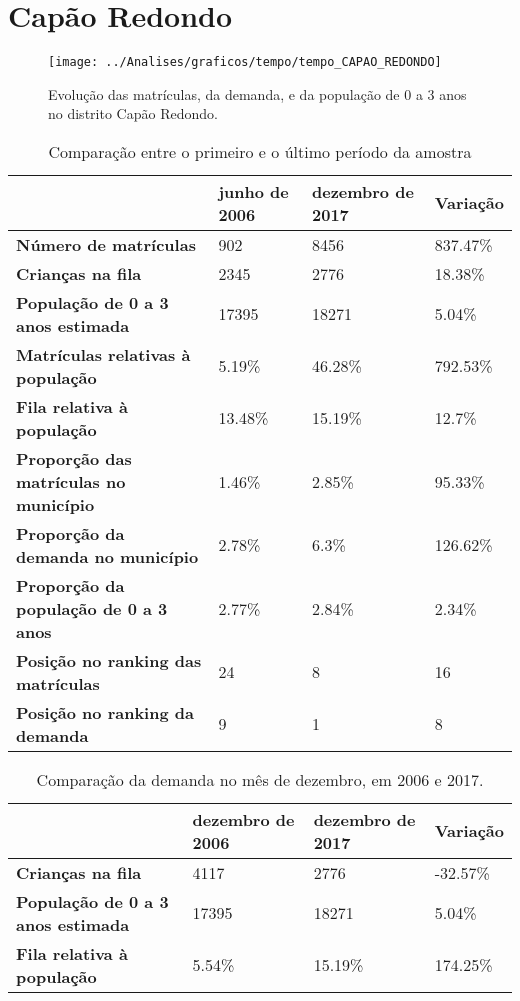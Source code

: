 \section{Capão Redondo}
\begin{figure}[H]
\centering
\texttt{[image: ../Analises/graficos/tempo/tempo\_CAPAO\_REDONDO]}
\caption{Evolução das matrículas, da demanda, e da população de 0 a 3 anos no distrito Capão Redondo.}
\end{figure}
\begin{table}[H]
\begin{tabular}{|l|l|l|l|}
\hline
\textbf{}                                      & \textbf{junho de 2006}       & \textbf{dezembro de 2017}    & \textbf{Variação} \\ \hline
\textbf{Número de matrículas}                  & 902 & 8456 & 837.47\% \\ \hline
\textbf{Crianças na fila}                      & 2345 & 2776 & 18.38\% \\ \hline
\textbf{População de 0 a 3 anos estimada}      & 17395 & 18271 & 5.04\% \\ \hline
\textbf{Matrículas relativas à população}      & 5.19\% & 46.28\% & 792.53\% \\ \hline
\textbf{Fila relativa à população}             & 13.48\% & 15.19\% & 12.7\% \\ \hline
\textbf{Proporção das matrículas no município} & 1.46\% & 2.85\% & 95.33\% \\ \hline
\textbf{Proporção da demanda no município}     & 2.78\% & 6.3\% & 126.62\% \\ \hline
\textbf{Proporção da população de 0 a 3 anos}  & 2.77\% & 2.84\% & 2.34\% \\ \hline
\textbf{Posição no ranking das matrículas}     & 24 & 8 & 16 \\ \hline
\textbf{Posição no ranking da demanda}         & 9 & 1 & 8 \\ \hline
\end{tabular}
\caption{Comparação entre o primeiro e o último período da amostra}
\end{table}
\begin{table}[H]
\begin{tabular}{|l|l|l|l|}
\hline
\textbf{}                                 & \textbf{dezembro de 2006} & \textbf{dezembro de 2017} & \textbf{Variação} \\ \hline
\textbf{Crianças na fila}                      & 4117 & 2776 & -32.57\% \\ \hline
\textbf{População de 0 a 3 anos estimada}      & 17395 & 18271 & 5.04\% \\ \hline
\textbf{Fila relativa à população}             & 5.54\% & 15.19\% & 174.25\% \\ \hline
\end{tabular}
\caption{Comparação da demanda no mês de dezembro, em 2006 e 2017.}
\end{table}
